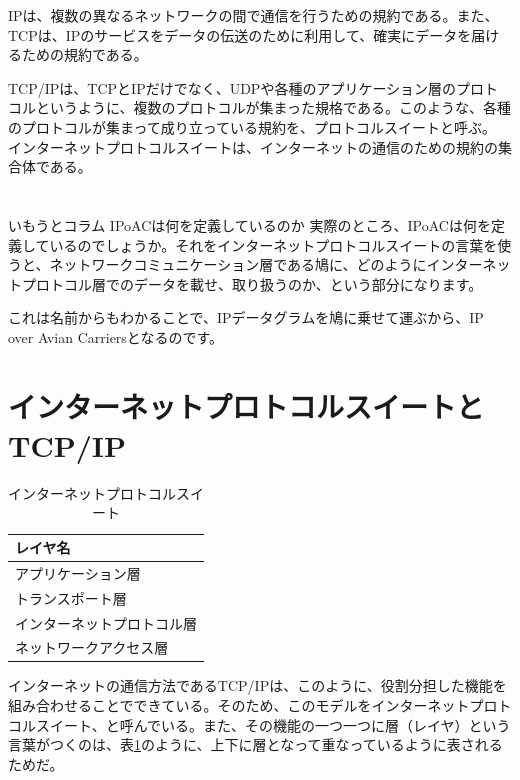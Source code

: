 IPは、複数の異なるネットワークの間で通信を行うための規約である。また、TCPは、IPのサービスをデータの伝送のために利用して、確実にデータを届けるための規約である。

TCP/IPは、TCPとIPだけでなく、UDPや各種のアプリケーション層のプロトコルというように、複数のプロトコルが集まった規格である。このような、各種のプロトコルが集まって成り立っている規約を、プロトコルスイートと呼ぶ。
インターネットプロトコルスイートは、インターネットの通信のための規約の集合体である。

\section*{}
\begin{itembox}[l]{いもうとコラム IPoACは何を定義しているのか}
実際のところ、IPoACは何を定義しているのでしょうか。それをインターネットプロトコルスイートの言葉を使うと、ネットワークコミュニケーション層である鳩に、どのようにインターネットプロトコル層でのデータを載せ、取り扱うのか、という部分になります。

これは名前からもわかることで、IPデータグラムを鳩に乗せて運ぶから、IP over Avian Carriersとなるのです。

\end{itembox}


\section{インターネットプロトコルスイートとTCP/IP}

\begin{table}[hbtp] 
\begin{center} \label{internetprotocolsuite}
	\begin{tabular}{l}  \toprule 
		レイヤ名 \\ \midrule
		アプリケーション層 \\
		トランスポート層 \\
		インターネットプロトコル層 \\
		ネットワークアクセス層 \\ \bottomrule
	\end{tabular} \caption{インターネットプロトコルスイート}
\end{center}
\end{table}

インターネットの通信方法であるTCP/IPは、このように、役割分担した機能を組み合わせることでできている。そのため、このモデルをインターネットプロトコルスイート、と呼んでいる。また、その機能の一つ一つに層（レイヤ）という言葉がつくのは、表\ref{internetprotocolsuite}のように、上下に層となって重なっているように表されるためだ。


